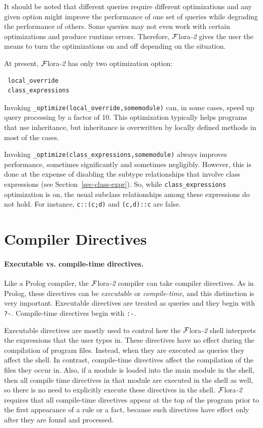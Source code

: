 \documentclass[11pt]{article}
\newcommand{\FLORA}{{\mbox{\sc ${\cal F}${lora}\rm\emph{-2}}}\xspace}
\begin{document}
It should be noted that different queries require different optimizations
and any given option might improve the performance of one set of queries
while degrading the performance of others.
Some queries may not even work with certain optimizations and produce
runtime errors.
Therefore, \FLORA gives the user
the means to turn the optimizations on and off depending on the situation.

At present, \FLORA has only two optimization option:
\begin{verbatim}
 local_override  
 class_expressions
\end{verbatim}
Invoking {\tt \_optimize(local\_override,somemodule)} can, in some cases,
speed up query processing by a factor of 10. This optimization typically
helps programs that use inheritance, but inheritance is overwritten by
locally defined methods in most of the cases.

Invoking {\tt \_optimize(class\_expressions,somemodule)} always improves
performance, sometimes significantly and sometimes negligibly.
However, this is done at the expense of disabling the subtype relationships
that involve class expressions (see Section~\ref{sec-class-expr}).
So, while {\tt class\_expressions} optimization is on, the usual
subclass relationships among these expressions do not hold. For instance,
{\tt c::(c;d)} and {\tt (c,d)::c} are false.


\section{Compiler Directives}
\label{sec-comp-directives}

%
\paragraph{Executable vs. compile-time directives.}
Like a Prolog compiler, the \FLORA compiler can take compiler directives.
As in Prolog, these directives can be \emph{executable} or
\emph{compile-time}, and this distinction is very important.
Executable directives are treated as queries and they begin with {\tt ?-}.
Compile-time directives begin with {\tt :-}.

Executable directives are mostly used to control how the \FLORA shell
interprets the expressions that the user types in. These directives have no
effect during the compilation of program files. Instead, when they are
executed as queries they affect the shell. In contrast, compile-time
directives affect the compilation of the files they occur in. Also, if a
module is loaded into the main module in the shell, then all compile time
directives in that module are executed in the shell as well, so there is no
need to explicitly execute these directives in the shell.
\FLORA requires
that all compile-time directives appear at the top of the program prior to
the first appearance of a rule or a fact, because such directives have
effect only after they are found and processed.
\end{document}
